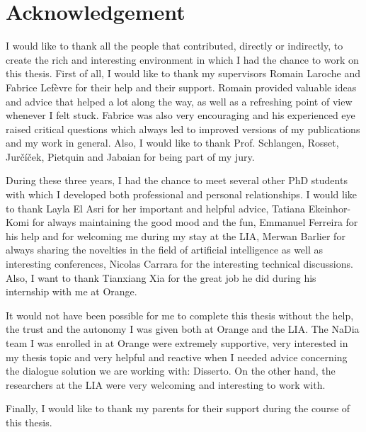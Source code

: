 \chapter*{Acknowledgement}

        I would like to thank all the people that contributed, directly or indirectly, to create the rich and interesting environment in which I had the chance to work on this thesis. First of all, I would like to thank my supervisors Romain Laroche and Fabrice Lef\`evre for their help and their support. Romain provided valuable ideas and advice that helped a lot along the way, as well as a refreshing point of view whenever I felt stuck. Fabrice was also very encouraging and his experienced eye raised critical questions which always led to improved versions of my publications and my work in general. Also, I would like to thank Prof. Schlangen, Rosset, Jur\v{c}\'i\v{c}ek, Pietquin and Jabaian for being part of my jury.

        During these three years, I had the chance to meet several other PhD students with which I developed both professional and personal relationships. I would like to thank Layla El Asri for her important and helpful advice, Tatiana Ekeinhor-Komi for always maintaining the good mood and the fun, Emmanuel Ferreira for his help and for welcoming me during my stay at the LIA, Merwan Barlier for always sharing the novelties in the field of artificial intelligence as well as interesting conferences, Nicolas Carrara for the interesting technical discussions. Also, I want to thank Tianxiang Xia for the great job he did during his internship with me at Orange.

        It would not have been possible for me to complete this thesis without the help, the trust and the autonomy I was given both at Orange and the LIA. The NaDia team I was enrolled in at Orange were extremely supportive, very interested in my thesis topic and very helpful and reactive when I needed advice concerning the dialogue solution we are working with: Disserto. On the other hand, the researchers at the LIA were very welcoming and interesting to work with.

        Finally, I would like to thank my parents for their support during the course of this thesis.

        
